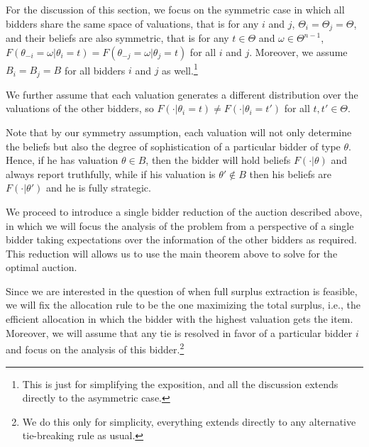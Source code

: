 \documentclass[12pt]{article}
\begin{document}
For the discussion of this section, we focus on the symmetric case in which all bidders share the same space of valuations, that is for any $i$ and $j$, $\Theta_i=\Theta_j=\Theta$, and their beliefs are also symmetric, that is for any $t\in \Theta$ and $\omega\in \Theta^{n-1}$, $F(\theta_{-i}=\omega|\theta_i=t)=F(\theta_{-j}=\omega|\theta_j=t)$ for all $i$ and $j$. Moreover, we assume $B_i=B_j=B$ for all bidders $i$ and $j$ as well.\footnote{This is just for simplifying the exposition, and all the discussion extends directly to the asymmetric case.}

We further assume that each valuation generates a different distribution over the valuations of the other bidders, so $F(\cdot|\theta_i=t)\neq F(\cdot|\theta_i=t')$ for all $t,t'\in\Theta$.%

Note that by our symmetry assumption, each valuation will not only determine the beliefs but also the degree of sophistication of a particular bidder of type $\theta$. Hence, if he has valuation $\theta\in B$, then the bidder will hold beliefs $F(\cdot|\theta)$ and always report truthfully, while if his valuation is $\theta'\not\in B$ then his beliefs are $F(\cdot|\theta')$ and he is fully strategic.


We proceed to introduce a single bidder reduction of the auction described above, in which we will focus the analysis of the problem from a perspective of a single bidder taking expectations over the information of the other bidders as required. This reduction will allows us to use the main theorem above to solve for the optimal auction. %

Since we are interested in the question of when full surplus extraction is feasible, we will fix the allocation rule to be the one maximizing the total surplus, i.e., the efficient allocation in which the bidder with the highest valuation gets the item. Moreover, we will assume that any tie is resolved in favor of a particular bidder $i$ and focus on the analysis of this bidder.\footnote{We do this only for simplicity, everything extends directly to any alternative tie-breaking rule as usual.}
\end{document}

